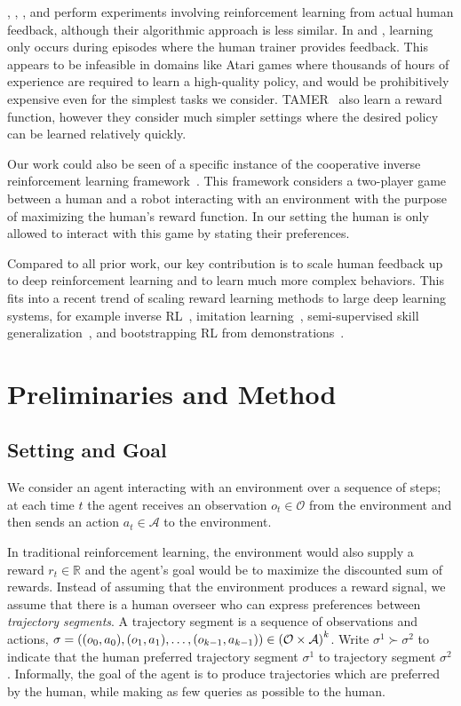 \documentclass{article}
\def\O{\mathcal{O}} %
\def\A{\mathcal{A}} %
\DeclarePairedDelimiter{\pdelims}{(}{)}
\newcommand{\of}[1]{\pdelims*{#1}}
\begin{document}
\citet{MacGlashan17}, \citet{Pilarski11}, \citet{Knox09}, and \citet{Knox12}
perform experiments involving reinforcement learning from actual human feedback,
although their algorithmic approach is less similar.
In \citet{MacGlashan17} and \citet{Pilarski11}, learning only occurs during episodes where the human trainer provides feedback.
This appears to be infeasible in domains like Atari games where thousands of hours of experience
are required to learn a high-quality policy, and would be prohibitively expensive even for the simplest tasks we consider. 
TAMER~\citep{Knox12, Knox13} also learn a reward function,
however they consider much simpler settings where the desired policy can be learned relatively quickly.

Our work could also be seen of a specific instance of the cooperative inverse reinforcement learning framework~\citep{CIRL}.
This framework considers a two-player game between a human and a robot interacting with an environment
with the purpose of maximizing the human's reward function.
In our setting the human is only allowed to interact with this game by stating their preferences.

Compared to all prior work,
our key contribution is to scale human feedback up to deep reinforcement learning and
to learn much more complex behaviors.
This fits into a recent trend of
scaling reward learning methods to large deep learning systems,
for example inverse RL~\citep{Finn16},
imitation learning~\citep{Ho16,Stadie17},
semi-supervised skill generalization~\citep{Finn17},
and bootstrapping RL from demonstrations~\citep{Silver16,Hester17}.


\section{Preliminaries and Method}

\subsection{Setting and Goal}

We consider an agent interacting with an environment over a sequence of steps;
at each time $t$ the agent receives an observation $o_t \in \O$ from the environment
and then sends an action $a_t \in \A$ to the environment.

In traditional reinforcement learning, the environment would also supply a reward $r_t \in \mathbb{R}$
and the agent's goal would be to maximize the discounted sum of rewards.
Instead of assuming that the environment produces a reward signal,
we assume that there is a human overseer who can express preferences between \emph{trajectory segments}.
A trajectory segment is a sequence of observations and actions,
$\sigma = \of{\of{o_0, a_0}, \of{o_{1}, a_{1}}, \ldots, \of{o_{k-1}, a_{k-1}}} \in \of{\O \times \A}^k$.
Write $\sigma^1 \succ \sigma^2$
to indicate that the human preferred trajectory segment $\sigma^1$
to trajectory segment $\sigma^2$.
Informally, the goal of the agent is to produce trajectories which are preferred by the human,
while making as few queries as possible to the human.
\end{document}
